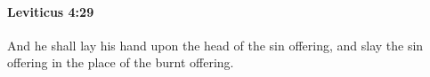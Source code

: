 
		\paragraph{Leviticus 4:29} %
			\label{LEVITICUS-4-29}

			And he shall lay his hand upon the head of the sin offering, and slay the sin offering in the place of the burnt offering.


